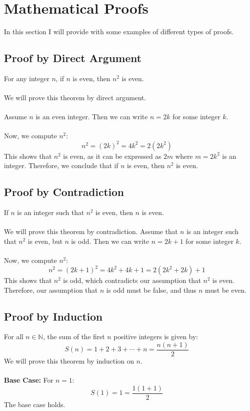 \newpage
\section{Mathematical Proofs}

In this section I will provide with some examples of different types of proofs.

\subsection{Proof by Direct Argument}

For any integer \( n \), if \( n \) is even, then \( n^2 \) is even.
\\\\
	We will prove this theorem by direct argument.
\\\\
	Assume \( n \) is an even integer. Then we can write \( n = 2k \) for some integer \( k \).
\\\\
	Now, we compute \( n^2 \):
	\[
		n^2 = {(2k)}^2 = 4k^2 = 2(2k^2)
	\]
	This shows that \( n^2 \) is even, as it can be expressed as \( 2m \) where \( m = 2k^2 \) is an integer.
	Therefore, we conclude that if \( n \) is even, then \( n^2 \) is even.
\QED

\subsection{Proof by Contradiction}

If \( n \) is an integer such that \( n^2 \) is even, then \( n \) is even.
\\\\
	We will prove this theorem by contradiction. Assume that \( n \) is an integer such that \( n^2 \) is even, but \( n \) is odd. Then we can write \( n = 2k + 1 \) for some integer \( k \).
\\\\
	Now, we compute \( n^2 \):
	\[
		n^2 = {(2k + 1)}^2 = 4k^2 + 4k + 1 = 2(2k^2 + 2k) + 1
	\]
	This shows that \( n^2 \) is odd, which contradicts our assumption that \( n^2 \) is even. Therefore, our assumption that \( n \) is odd must be false, and thus \( n \) must be even.
\QED

\subsection{Proof by Induction}

For all \( n \in \mathbb{N} \), the sum of the first \( n \) positive integers is given by:
\[
	S(n) = 1 + 2 + 3 + \cdots + n = \frac{n(n+1)}{2}
\]
We will prove this theorem by induction on \( n \).
\\\\
	\textbf{Base Case:} For \( n = 1 \):
	\[
		S(1) = 1 = \frac{1(1+1)}{2}
	\]
	The base case holds.

